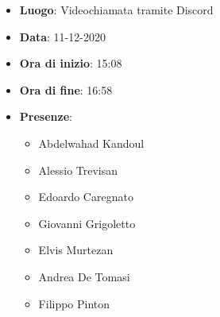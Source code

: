 \begin{itemize}
    \item \textbf{Luogo}: Videochiamata tramite Discord
    \item \textbf{Data}: 11-12-2020
    \item \textbf{Ora di inizio}: 15:08
    \item \textbf{Ora di fine}: 16:58
    \item \textbf{Presenze}:
          \begin{itemize}
              \item Abdelwahad Kandoul
              \item Alessio Trevisan
              \item Edoardo Caregnato
              \item Giovanni Grigoletto
              \item Elvis Murtezan
              \item Andrea De Tomasi
              \item Filippo Pinton
          \end{itemize}
\end{itemize}
